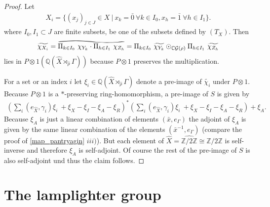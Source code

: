 \documentclass[12pt,a4paper]{scrartcl}
\theoremstyle{plain}
\theoremstyle{definition}
\newcommand{\C}{\mathbb{C}} %
\newcommand{\Q}{\mathbb{Q}} %
\newcommand{\2}{\mathbb{Z} / 2 \mathbb{Z}}
\newcommand{\G}{\mathcal{G}}
\newcommand{\1}{\bar{1}}
\newcommand{\0}{\bar{0}}
\newcommand{\reallywidetilde}[1]{\ThisStyle{%
		\setbox0=\hbox{$\SavedStyle#1$}%
		\stackengine{-.1\LMpt}{$\SavedStyle#1$}{%
			\stretchto{\scaleto{\SavedStyle\mkern.2mu\AC}{.5150\wd0}}{.6\ht0}%
		}{O}{c}{F}{T}{S}%
}}
\begin{document}
\begin{proof}
	Let 
	\begin{align*}
		X_i = \{(x_j)_{j \in J} \in X \ | \ x_k = \0 \ \forall k \in I_0, x_h = \1 \ \forall h \in I_1\}.
	\end{align*}
	where $I_0, I_1 \subset J$ are finite subsets, be one of the subsets defined by $(T_X)$. Then 
	\begin{align*}
		\widetilde{\chi_{X_i}} = \reallywidetilde{\Pi_{k \in I_0} ~ \chi_{Y_k} \cdot \Pi_{h \in I_1} ~\chi_{Z_h}} = \Pi_{k \in I_0} ~ \widetilde{\chi_{Y_k}} \odot_{\C\G(\rho)} \Pi_{h \in I_1} ~\widetilde{\chi_{Z_h}}
	\end{align*}
	lies in $P \otimes 1(\Q (\hat{X} \rtimes_{\hat{\rho}} \Gamma))$ because $P \otimes 1$ preserves the multiplication.
	
	For a set or an index $i$ let $\xi_i \in \Q (\hat{X} \rtimes_{\hat{\rho}} \Gamma)$ denote a pre-image of $\widetilde{\chi_i}$ under $P \otimes 1$. Because $P \otimes 1$ is a $*$-preserving ring-homomorphism, a pre-image of $S$ is given by
	\begin{align*}
		(\sum_{i} (e_{\hat{X}}, \gamma_i) \xi_i \ + \xi_X - \xi_I - \xi_A - \xi_R)^*(\sum_{i} (e_{\hat{X}}, \gamma_i) \xi_i \ + \xi_X - \xi_I - \xi_A - \xi_R) + \xi_A.
	\end{align*}
	Because $\xi_A$ is just a linear combination of elements $(\bar{x}, e_\Gamma)$ the adjoint of $\xi_A$ is given by the same linear combination of the elements $(\bar{x}^{-1}, e_\Gamma)$ (compare the proof of \ref{map_pantryagin} $iii)$). But each element of $\hat{X} = \widehat{\2} \cong \2$ is self-inverse and therefore $\xi_A$ is self-adjoint. Of course the rest of the pre-image of $S$ is also self-adjoint und thus the claim follows.
\end{proof}

\section{The lamplighter group} \label{chlamplighter}
\end{document}
